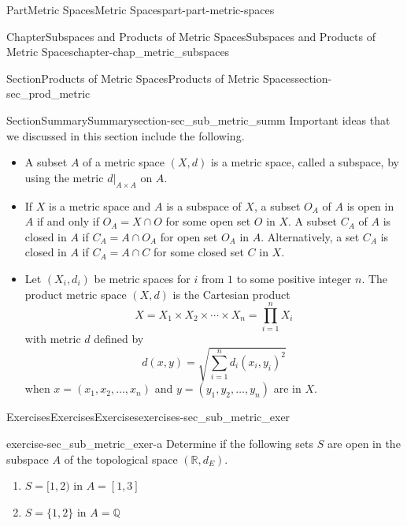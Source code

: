 \documentclass[oneside,10pt,]{book}
\numberwithin{equation}{chapter}
\newcommand{\Q}{\mathbb{Q}}
\newcommand{\R}{\mathbb{R}}
\begin{document}
\begin{partptx}{Part}{Metric Spaces}{}{Metric Spaces}{}{}{part-part-metric-spaces}
\begin{chapterptx}{Chapter}{Subspaces and Products of Metric Spaces}{}{Subspaces and Products of Metric Spaces}{}{}{chapter-chap_metric_subspaces}
\begin{sectionptx}{Section}{Products of Metric Spaces}{}{Products of Metric Spaces}{}{}{section-sec_prod_metric}
\end{sectionptx}
%
%
\typeout{************************************************}
\typeout{************************************************}
%
\begin{sectionptx}{Section}{Summary}{}{Summary}{}{}{section-sec_sub_metric_summ}
Important ideas that we discussed in this section include the following.%
\begin{itemize}[label=\textbullet]
\item{}A subset \(A\) of a metric space \((X,d)\) is a metric space, called a subspace, by using the metric \(d|_{A \times A}\) on \(A\).%
\item{}If \(X\) is a metric space and \(A\) is a subspace of \(X\), a subset \(O_A\) of \(A\) is open in \(A\) if and only if \(O_A = X \cap O\) for some open set \(O\) in \(X\). A subset \(C_A\) of \(A\) is closed in \(A\) if \(C_A = A \cap O_A\) for open set \(O_A\) in \(A\). Alternatively, a set \(C_A\) is closed in \(A\) if \(C_A = A \cap C\) for some closed set \(C\) in \(X\).%
\item{}Let \((X_i, d_i)\) be metric spaces for \(i\) from \(1\) to some positive integer \(n\). The product metric space \((X,d)\) is the Cartesian product%
\begin{equation*}
X = X_1 \times X_2 \times \cdots \times X_n = \prod_{i=1}^n X_i
\end{equation*}
with metric \(d\) defined by%
\begin{equation*}
d(x,y) = \sqrt{\sum_{i=1}^n d_i(x_i,y_i)^2}
\end{equation*}
when \(x = (x_1, x_2, \ldots,
x_n)\) and \(y = (y_1, y_2, \ldots, y_n)\) are in \(X\).%
\end{itemize}
%
\end{sectionptx}
%
%
\typeout{************************************************}
\typeout{************************************************}
%
\begin{exercises-section}{Exercises}{Exercises}{}{Exercises}{}{}{exercises-sec_sub_metric_exer}
\begin{divisionexercise}{1}{}{}{exercise-sec_sub_metric_exer-a}%
Determine if the following sets \(S\) are open in the subspace \(A\) of the topological space \((\R, d_E)\).%
\begin{enumerate}[font=\bfseries,label=(\alph*),ref=\alph*]%
\item{}\(S = [1,2)\) in \(A = [1,3]\)%
\item{}\(S = \{1, 2\}\) in \(A = \Q\)%

\end{enumerate}
\end{divisionexercise}
\end{exercises-section}
\end{chapterptx}
\end{partptx}
\end{document}
